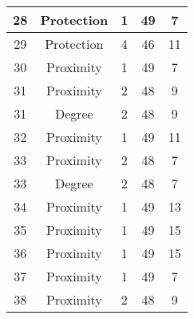 \documentclass[results.tex]{subfiles}
\begin{document}
\begin{center}
\begin{tabular}{| c || c | c | c | c |}
            \hline
            28                      & Protection                   & 1                      & 49                      & 7                    \\
            \hline
            29                      & Protection                   & 4                      & 46                      & 11                   \\
            \hline
            30                      & Proximity                    & 1                      & 49                      & 7                    \\
            \hline
            31                      & Proximity                    & 2                      & 48                      & 9                    \\
            \hline
            31                      & Degree                       & 2                      & 48                      & 9                    \\
            \hline
            32                      & Proximity                    & 1                      & 49                      & 11                   \\
            \hline
            33                      & Proximity                    & 2                      & 48                      & 7                    \\
            \hline
            33                      & Degree                       & 2                      & 48                      & 7                    \\
            \hline
            34                      & Proximity                    & 1                      & 49                      & 13                   \\
            \hline
            35                      & Proximity                    & 1                      & 49                      & 15                   \\
            \hline
            36                      & Proximity                    & 1                      & 49                      & 15                   \\
            \hline
            37                      & Proximity                    & 1                      & 49                      & 7                    \\
            \hline
            38                      & Proximity                    & 2                      & 48                      & 9                    \\

\end{tabular}
\end{center}
\end{document}
